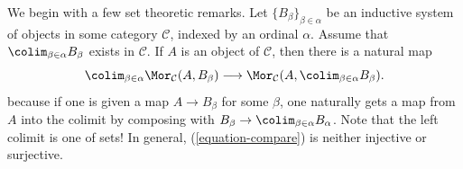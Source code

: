 \medskip\noindent
We begin with a few set theoretic remarks.
Let $\{B_{\beta}\}_{\beta \in \alpha}$ be an inductive system of
objects in some category $\mathcal{C}$, indexed by
an ordinal $\alpha$. Assume that $\colim_{\beta \in \alpha} B_\beta$
exists in $\mathcal{C}$. If $A$ is an object of $\mathcal{C}$, then there is a
natural map
\begin{equation}
\label{equation-compare}
\colim_{\beta \in \alpha} \Mor_\mathcal{C}(A, B_\beta)
\longrightarrow
\Mor_\mathcal{C}(A, \colim_{\beta \in \alpha} B_\beta).
\end{equation}
because if one is given a map $A \to B_\beta$ for some $\beta$, one
naturally gets a map from $A$  into the colimit by composing with
$B_\beta \to \colim_{\beta \in \alpha} B_\alpha$.
Note that the left colimit is one of sets! In general, (\ref{equation-compare})
is neither injective or surjective.